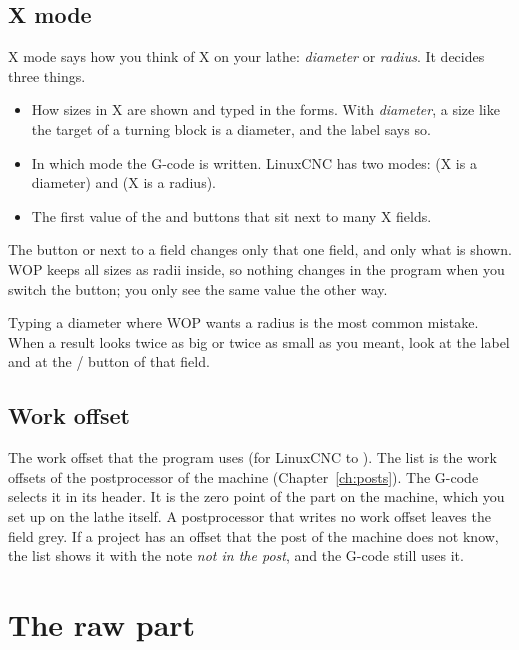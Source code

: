 \subsection{X mode}\label{sec:project:xmode}
X mode says how you think of X on your lathe: \emph{diameter} or \emph{radius}. It decides three things.

\begin{itemize}
\item How sizes in X are shown and typed in the forms. With \emph{diameter}, a size like the target of a turning block is a diameter, and the label says so.
\item In which mode the G-code is written. LinuxCNC has two modes:  (X is a diameter) and  (X is a radius).
\item The first value of the  and  buttons that sit next to many X fields.
\end{itemize}

The button  or  next to a field changes only that one field, and only what is shown. WOP keeps all sizes as radii inside, so nothing changes in the program when you switch the button; you only see the same value the other way.

\begin{notebox}
Typing a diameter where WOP wants a radius is the most common mistake. When a result looks twice as big or twice as small as you meant, look at the label and at the  /  button of that field.
\end{notebox}

\subsection{Work offset}
The work offset that the program uses (for LinuxCNC  to ). The list is the work offsets of the postprocessor of the machine (Chapter~\ref{ch:posts}). The G-code selects it in its header. It is the zero point of the part on the machine, which you set up on the lathe itself. A postprocessor that writes no work offset leaves the field grey. If a project has an offset that the post of the machine does not know, the list shows it with the note \emph{not in the post}, and the G-code still uses it.

\section{The raw part}\label{sec:project:part}

